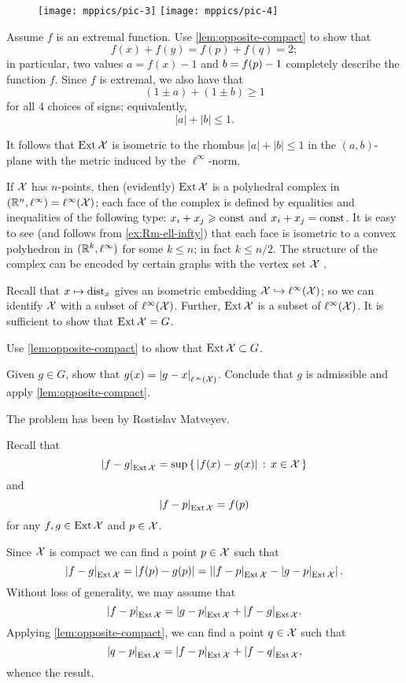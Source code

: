 \begin{wrapfigure}{r}{27 mm}
\vskip-0mm
\centering
\texttt{[image: mppics/pic-3]}
\bigskip
\texttt{[image: mppics/pic-4]}
\end{wrapfigure}

Assume $f$ is an extremal function.
Use \ref{lem:opposite-compact} to show that
\[f(x)+f(y)=f(p)+f(q)=2;\]
in particular, two values $a=f(x)-1$ and $b\z=f(p)-1$ completely describe the function $f$.
Since $f$ is extremal, we also have that 
\[(1\pm a)+(1\pm b)\ge 1\]
for all 4 choices of signs;
equivalently, 
\[|a|+|b|\le 1.\]

It follows that $\mathop{\rm Ext}\nolimits\mathcal{X}$ is isometric to the rhombus $|a|+|b|\le 1$ in the $(a,b)$-plane with the metric induced by the $\ell^\infty$-norm.

If $\mathcal{X}$ has $n$-points, then (evidently) $\mathop{\rm Ext}\nolimits\mathcal{X}$ is a polyhedral complex in $(\mathbb{R}^n,\ell^\infty) =\ell^\infty(\mathcal{X})$;
each face of the complex is defined by equalities and inequalities of the following type: $x_i+x_j\geqslant \operatorname{\rm const}\nolimits$ and  $x_i+x_j= \operatorname{\rm const}\nolimits$.
It is easy to see (and follows from \ref{ex:Rm-ell-infty}) that each face is isometric to a convex polyhedron in  $(\mathbb{R}^k,\ell^\infty)$ for some $k\le n$;
in fact $k\le n/2$.
The structure of the complex can be encoded by certain graphs with the vertex set $\mathcal{X}$ \cite[see Section 4 in][]{lang-2013}.

Recall that $x\mapsto \mathrm{dist}_x$ gives an isometric embedding $\spc{X}\z\hookrightarrow\ell^\infty(\spc{X})$;
so we can identify $\mathcal{X}$ with a subset of $\ell^\infty(\mathcal{X})$.
Further, $\mathop{\rm Ext}\nolimits\mathcal{X}$ is a subset of $\ell^\infty(\mathcal{X})$.
It is sufficient to show that $\mathop{\rm Ext}\nolimits\mathcal{X}=G$.

Use \ref{lem:opposite-compact} to show that $\mathop{\rm Ext}\nolimits\mathcal{X}\subset G$.

Given $g\in G$, show that $g(x)=\dist{g}{x}{\ell^\infty(\spc{X})}$.
Conclude that $g$ is admissible and apply \ref{lem:opposite-compact}.

 The problem has been by Rostislav Matveyev.

Recall that 
\[\dist{f}{g}{\Inj\spc{X}}=\sup\set{|f(x)-g(x)|}{x\in\spc{X}}\]
and 
\[\dist{f}{p}{\Inj\spc{X}}=f(p)\]
for any $f,g\in \mathop{\rm Ext}\nolimits\mathcal{X}$ and $p\in \mathcal{X}$.

Since $\mathcal{X}$ is compact we can find a point $p\in\mathcal{X}$ such that 
\[\dist{f}{g}{\Inj\spc{X}}=|f(p)-g(p)|=\left|\dist{f}{p}{\Inj\spc{X}}-\dist{g}{p}{\Inj\spc{X}}\right|.\]
Without loss of generality, we may assume that 
\[\dist{f}{p}{\Inj\spc{X}}
=
\dist{g}{p}{\Inj\spc{X}}
+
\dist{f}{g}{\Inj\spc{X}}.\]
Applying \ref{lem:opposite-compact}, we can find a point $q\in\mathcal{X}$ such that 
\[\dist{q}{p}{\Inj\spc{X}}
=
\dist{f}{p}{\Inj\spc{X}}
+
\dist{f}{q}{\Inj\spc{X}},\]
whence the result.

